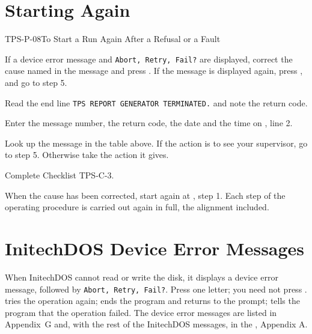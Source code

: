 
\section{Starting Again}
\begin{Procedure}{TPS-P-08}{To Start a Run Again After a Refusal or a Fault}
\begin{ProcSteps}
\item If a device error message and \texttt{Abort, Retry, Fail?} are
  displayed, correct the cause named in the message and press .  If
  the message is displayed again, press , and go to step 5.
\item Read the end line \texttt{TPS REPORT GENERATOR TERMINATED.} and note the
  return code.
\item Enter the message number, the return code, the date and the time on
  , line 2.
\item Look up the message in the table above.  If the action is to see your
  supervisor, go to step 5.  Otherwise take the action it gives.
\item Complete Checklist TPS-C-3.
\item When the cause has been corrected, start again at , step 1.
  Each step of the operating procedure is carried out again in full, the
  alignment included.
\end{ProcSteps}
\end{Procedure}

\section{InitechDOS Device Error Messages}
When InitechDOS cannot read or write the disk, it displays a device error
message, followed by \texttt{Abort, Retry, Fail?}.  Press one letter; you need
not press .   tries the operation again;  ends the
program and returns to the prompt;  tells the program that the
operation failed.  The device error messages are listed in Appendix~G and,
with the rest of the InitechDOS messages, in the , Appendix A.

